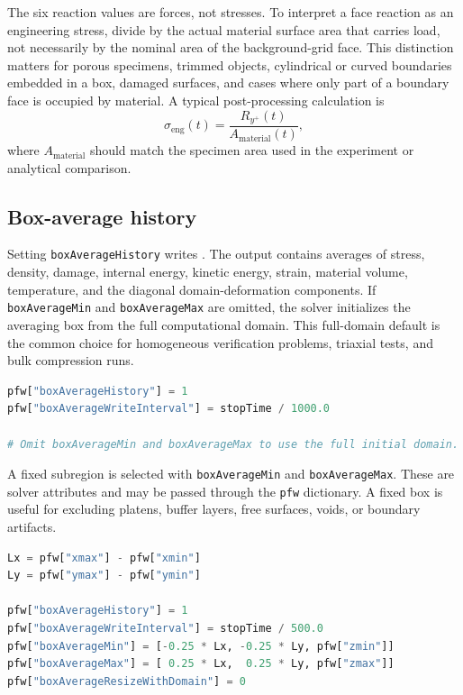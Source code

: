 The six reaction values are forces, not stresses.  To interpret a face reaction as an engineering stress, divide by the actual material surface area that carries load, not necessarily by the nominal area of the background-grid face.  This distinction matters for porous specimens, trimmed objects, cylindrical or curved boundaries embedded in a box, damaged surfaces, and cases where only part of a boundary face is occupied by material.  A typical post-processing calculation is
\begin{equation}
  \sigma_{\mathrm{eng}}(t) = \frac{R_{y^+}(t)}{A_{\mathrm{material}}(t)},
\end{equation}
where \(A_{\mathrm{material}}\) should match the specimen area used in the experiment or analytical comparison.

\subsection{Box-average history}
\label{subsec:pfw-box-average-history}

Setting \texttt{boxAverageHistory} writes .  The output contains averages of stress, density, damage, internal energy, kinetic energy, strain, material volume, temperature, and the diagonal domain-deformation components.  If \texttt{boxAverageMin} and \texttt{boxAverageMax} are omitted, the solver initializes the averaging box from the full computational domain.  This full-domain default is the common choice for homogeneous verification problems, triaxial tests, and bulk compression runs.

\begin{lstlisting}[language=Python,caption={Full-domain box-average history.}]
pfw["boxAverageHistory"] = 1
pfw["boxAverageWriteInterval"] = stopTime / 1000.0

# Omit boxAverageMin and boxAverageMax to use the full initial domain.
\end{lstlisting}

A fixed subregion is selected with \texttt{boxAverageMin} and \texttt{boxAverageMax}.  These are solver attributes and may be passed through the \texttt{pfw} dictionary.  A fixed box is useful for excluding platens, buffer layers, free surfaces, voids, or boundary artifacts.

\begin{lstlisting}[language=Python,caption={Fixed Eulerian sub-box average.}]
Lx = pfw["xmax"] - pfw["xmin"]
Ly = pfw["ymax"] - pfw["ymin"]

pfw["boxAverageHistory"] = 1
pfw["boxAverageWriteInterval"] = stopTime / 500.0
pfw["boxAverageMin"] = [-0.25 * Lx, -0.25 * Ly, pfw["zmin"]]
pfw["boxAverageMax"] = [ 0.25 * Lx,  0.25 * Ly, pfw["zmax"]]
pfw["boxAverageResizeWithDomain"] = 0
\end{lstlisting}

